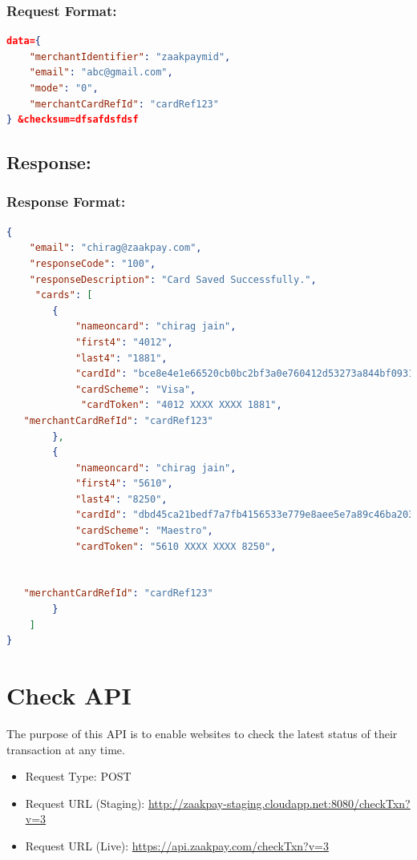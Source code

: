 \documentclass{article}
\begin{document}
 \subsubsection{Request Format:}
  \begin{lstlisting}[language=json,breaklines=true]
data={ 
    "merchantIdentifier": "zaakpaymid", 
    "email": "abc@gmail.com", 
    "mode": "0", 
    "merchantCardRefId": "cardRef123" 
} &checksum=dfsafdsfdsf 
\end{lstlisting}
 \newpage
 \subsection{Response:}
 \subsubsection{Response Format:}
  \begin{lstlisting}[language=json,breaklines=true]
{ 
    "email": "chirag@zaakpay.com", 
    "responseCode": "100", 
    "responseDescription": "Card Saved Successfully.", 
     "cards": [ 
        { 
            "nameoncard": "chirag jain", 
            "first4": "4012", 
            "last4": "1881", 
            "cardId": "bce8e4e1e66520cb0bc2bf3a0e760412d53273a844bf0931f2b3136a2ee0ada3~1", 
            "cardScheme": "Visa", 
             "cardToken": "4012 XXXX XXXX 1881", 
   "merchantCardRefId": "cardRef123" 
        }, 
        { 
            "nameoncard": "chirag jain", 
            "first4": "5610", 
            "last4": "8250", 
            "cardId": "dbd45ca21bedf7a7fb4156533e779e8aee5e7a89c46ba203c85c89f91bd21dd9~12", 
            "cardScheme": "Maestro", 
            "cardToken": "5610 XXXX XXXX 8250", 
 
 
   "merchantCardRefId": "cardRef123" 
        } 
    ] 
} 
\end{lstlisting}
\newpage

 \section{Check API}
The purpose of this API is to enable websites to check the latest status of their transaction at any time.
\begin{itemize}
\item Request Type: POST
\item Request URL (Staging): \url{http://zaakpay-staging.cloudapp.net:8080/checkTxn?v=3}
\item Request URL (Live): \url{https://api.zaakpay.com/checkTxn?v=3}
\end{itemize}
\end{document}
